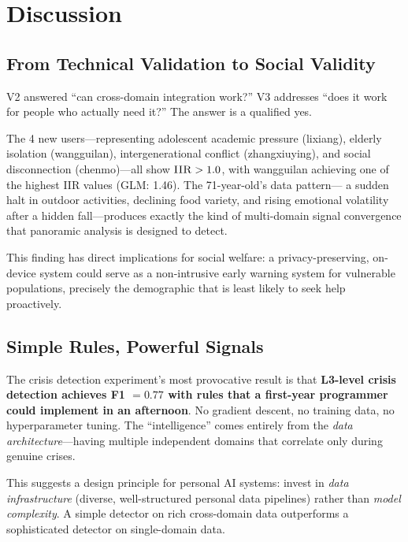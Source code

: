 \documentclass[11pt,a4paper]{article}
\newcommand{\iir}{\textsc{IIR}}
\begin{document}
\section{Discussion}
\label{sec:discussion}

\subsection{From Technical Validation to Social Validity}

V2 answered ``can cross-domain integration work?'' V3 addresses ``does it
work for people who actually need it?'' The answer is a qualified yes.

The 4 new users---representing adolescent academic pressure (lixiang), elderly
isolation (wangguilan), intergenerational conflict (zhangxiuying), and social
disconnection (chenmo)---all show $\iir{} > 1.0$, with wangguilan achieving
one of the highest IIR values (GLM: 1.46). The 71-year-old's data pattern---
a sudden halt in outdoor activities, declining food variety, and rising
emotional volatility after a hidden fall---produces exactly the kind of
multi-domain signal convergence that panoramic analysis is designed to detect.

This finding has direct implications for social welfare: a privacy-preserving,
on-device system could serve as a non-intrusive early warning system for
vulnerable populations, precisely the demographic that is least likely to
seek help proactively.

\subsection{Simple Rules, Powerful Signals}

The crisis detection experiment's most provocative result is that
\textbf{L3-level crisis detection achieves F1 $= 0.77$ with rules that a
first-year programmer could implement in an afternoon}. No gradient descent,
no training data, no hyperparameter tuning. The ``intelligence'' comes
entirely from the \emph{data architecture}---having multiple independent
domains that correlate only during genuine crises.

This suggests a design principle for personal AI systems: invest in
\emph{data infrastructure} (diverse, well-structured personal data pipelines)
rather than \emph{model complexity}. A simple detector on rich cross-domain
data outperforms a sophisticated detector on single-domain data.
\end{document}
